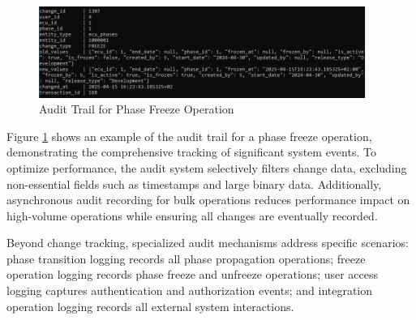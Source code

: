 \begin{figure}[h]
    \centering
    \includegraphics[width=0.95\textwidth]{figures/freeze_audit_trail.png}
    \caption{Audit Trail for Phase Freeze Operation}
    \label{fig:freeze-audit-trail}
\end{figure}

Figure \ref{fig:freeze-audit-trail} shows an example of the audit trail for a phase freeze operation, demonstrating the comprehensive tracking of significant system events. To optimize performance, the audit system selectively filters change data, excluding non-essential fields such as timestamps and large binary data. Additionally, asynchronous audit recording for bulk operations reduces performance impact on high-volume operations while ensuring all changes are eventually recorded.

Beyond change tracking, specialized audit mechanisms address specific scenarios: phase transition logging records all phase propagation operations; freeze operation logging records phase freeze and unfreeze operations; user access logging captures authentication and authorization events; and integration operation logging records all external system interactions.
